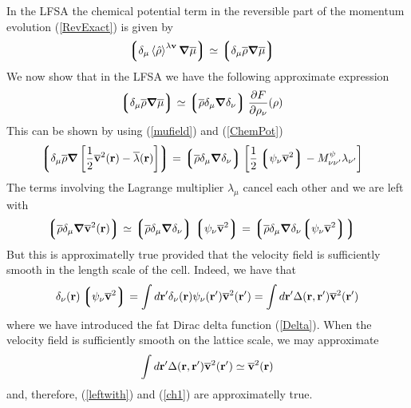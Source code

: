 \documentclass[b5paper,openright,11pt]{book}
\newcommand{\llangle}{\left\langle}
\newcommand{\rrangle}{\right\rangle}
\newcommand{\llg}{\left\lgroup}
\newcommand{\rlg}{\right\rgroup}
\begin{document}
\begin{appendices}
In the LFSA the chemical potential  term in the reversible part of the
momentum evolution (\ref{RevExact}) is given by
\begin{align}
  \llg\delta_\mu\llangle\hat{\rho}\rrangle^{\lambda{\bf v}}\boldsymbol{\nabla}\overline{\mu}\rlg
&\simeq\llg\delta_\mu\overline{\rho}\boldsymbol{\nabla}\overline{\mu}\rlg
\end{align}
We now show that in the LFSA we have the following approximate expression
  \begin{align}
  \llg\delta_\mu\overline{\rho}\boldsymbol{\nabla}\overline{\mu}\rlg&\simeq
\llg\overline{\rho}\delta_{\mu}\boldsymbol{\nabla}\delta_{\nu}\rlg
\frac{\partial  F}{\partial \rho_{\nu}}(\rho)
\label{ch1}
  \end{align}
This can be shown by using (\ref{mufield}) and (\ref{ChemPot})
  \begin{align}
  \llg\delta_\mu\overline{\rho}\boldsymbol{\nabla}\left[
\frac{1}{2}\overline{\bf v}^2({\bf r})-\overline{\lambda}({\bf r})\right]
\rlg&=
\llg\overline{\rho}\delta_{\mu}\boldsymbol{\nabla}\delta_{\nu}\rlg
\left[\frac{1}{2}\llg\psi_\nu\overline{\bf v}^2\rlg-  M^{\psi}_{\nu\nu'}\lambda_{\nu'}\right]
  \end{align}
The terms involving the Lagrange multiplier $\lambda_\mu$ cancel each other and we 
are left with 
\begin{align}
  \llg\overline{\rho}\delta_\mu\boldsymbol{\nabla}
\overline{\bf v}^2({\bf r})
\rlg&\simeq
\llg\overline{\rho}\delta_{\mu}\boldsymbol{\nabla}\delta_{\nu}\rlg
\llg\psi_\nu\overline{\bf v}^2\rlg
=\llg\overline{\rho}\delta_{\mu}\boldsymbol{\nabla}\delta_{\nu}{\llg\psi_\nu\overline{\bf v}^2\rlg}\rlg
\label{leftwith}
\end{align}
But this is approximatelly true provided that the velocity field is sufficiently smooth
in the length scale of the cell. Indeed, we have that 
\begin{align}
\delta_{\nu}({\bf r})\llg\psi_\nu\overline{\bf v}^2\rlg=
\int d{\bf r}'
\delta_{\nu}({\bf r})\psi_\nu({\bf r}')\overline{\bf v}^2({\bf r}')=
\int d{\bf r}'
\Delta({\bf r},{\bf r}')\overline{\bf v}^2({\bf r}')
\end{align}
where we have introduced the fat Dirac delta function (\ref{Delta}). When the
velocity field is sufficiently smooth on the lattice scale, we may approximate
\begin{align}
  \int d{\bf r}'
\Delta({\bf r},{\bf r}')\overline{\bf v}^2({\bf r}')\simeq \overline{\bf v}^2({\bf r})
\end{align}
and, therefore, (\ref{leftwith}) and (\ref{ch1}) are approximatelly true. 


\end{appendices}
\end{document}
